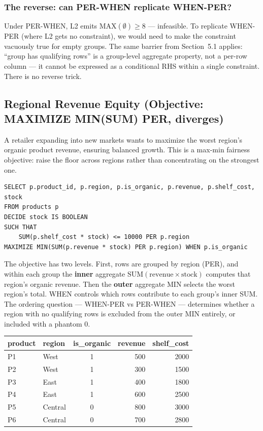\documentclass[11pt]{article}
\begin{document}
\subsubsection*{The reverse: can PER-WHEN replicate WHEN-PER?}

Under PER-WHEN, L2 emits $\text{MAX}(\emptyset) \geq 8$ --- infeasible.
To replicate WHEN-PER (where L2 gets no constraint), we would need to make
the constraint vacuously true for empty groups. The same barrier from
Section~5.1 applies: ``group has qualifying rows'' is a group-level
aggregate property, not a per-row column --- it cannot be expressed as a
conditional RHS within a single constraint. There is no reverse trick.

\subsection{Regional Revenue Equity (Objective: MAXIMIZE MIN(SUM) PER, diverges)}

A retailer expanding into new markets wants to maximize the worst region's
organic product revenue, ensuring balanced growth. This is a max-min fairness
objective: raise the floor across regions rather than concentrating on the
strongest one.

\begin{lstlisting}
SELECT p.product_id, p.region, p.is_organic, p.revenue, p.shelf_cost, stock
FROM products p
DECIDE stock IS BOOLEAN
SUCH THAT
    SUM(p.shelf_cost * stock) <= 10000 PER p.region
MAXIMIZE MIN(SUM(p.revenue * stock) PER p.region) WHEN p.is_organic
\end{lstlisting}

The objective has two levels. First, rows are grouped by region (PER),
and within each group the \textbf{inner} aggregate
$\text{SUM}(\text{revenue} \times \text{stock})$ computes that region's
organic revenue. Then the \textbf{outer} aggregate MIN selects the worst
region's total. WHEN controls which rows contribute to each group's inner
SUM. The ordering question --- WHEN-PER vs PER-WHEN --- determines whether
a region with no qualifying rows is excluded from the outer MIN entirely,
or included with a phantom 0.

\begin{center}
\begin{tabular}{llcrr}
\toprule
\textbf{product} & \textbf{region} & \textbf{is\_organic} & \textbf{revenue} & \textbf{shelf\_cost} \\
\midrule
P1  & West    & 1 & 500 & 2000 \\
P2  & West    & 1 & 300 & 1500 \\
P3  & East    & 1 & 400 & 1800 \\
P4  & East    & 1 & 600 & 2500 \\
P5  & Central & 0 & 800 & 3000 \\
P6  & Central & 0 & 700 & 2800 \\
\bottomrule
\end{tabular}
\end{center}
\end{document}
